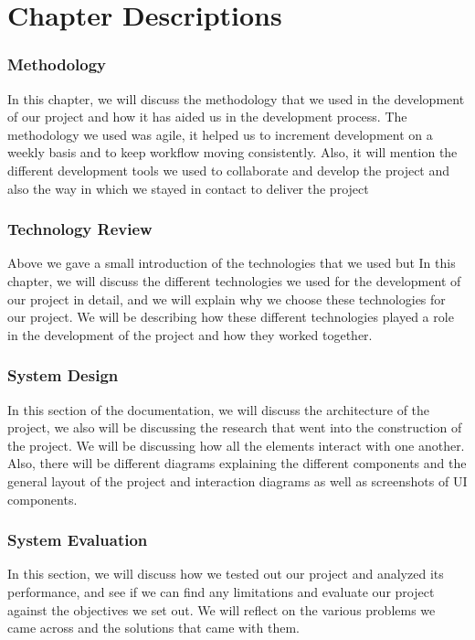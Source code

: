 \section{Chapter Descriptions}
\subsubsection{Methodology}
In this chapter, we will discuss the methodology that we used in the development of our project and how it has aided us in the development process. The methodology we used was agile, it helped us to increment development on a weekly basis and to keep workflow moving consistently. Also, it will mention the different development tools we used to collaborate and develop the project and also the way in which we stayed in contact to deliver the project

\subsubsection{Technology Review}
Above we gave a small introduction of the technologies that we used but
In this chapter, we will discuss the different technologies we used for the development of our project in detail, and we will explain why we choose these technologies for our project. We will be describing how these different technologies played a role in the development of the project and how they worked together.

\subsubsection{System Design} 
In this section of the documentation, we will discuss the architecture of the project, we also will be discussing the research that went into the construction of the project. We will be discussing how all the elements interact with one another. Also, there will be different diagrams explaining the different components and the general layout of the project and  interaction diagrams as well as
screenshots of UI components.

\subsubsection{System Evaluation}
In this section, we will discuss how we tested out our project and analyzed its performance, and see if we can find any limitations and evaluate our project against the objectives we set out. We will reflect on the various problems we came across and the solutions that came with them.

